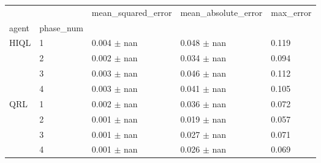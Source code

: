 \begin{tabular}{lllll}
\toprule
 &  & mean_squared_error & mean_absolute_error & max_error \\
agent & phase_num &  &  &  \\
\midrule
\multirow[t]{4}{*}{HIQL} & 1 & 0.004 $\pm$ nan & 0.048 $\pm$ nan & 0.119 \\
 & 2 & 0.002 $\pm$ nan & 0.034 $\pm$ nan & 0.094 \\
 & 3 & 0.003 $\pm$ nan & 0.046 $\pm$ nan & 0.112 \\
 & 4 & 0.003 $\pm$ nan & 0.041 $\pm$ nan & 0.105 \\
\cline{1-5}
\multirow[t]{4}{*}{QRL} & 1 & 0.002 $\pm$ nan & 0.036 $\pm$ nan & 0.072 \\
 & 2 & 0.001 $\pm$ nan & 0.019 $\pm$ nan & 0.057 \\
 & 3 & 0.001 $\pm$ nan & 0.027 $\pm$ nan & 0.071 \\
 & 4 & 0.001 $\pm$ nan & 0.026 $\pm$ nan & 0.069 \\
\cline{1-5}
\bottomrule
\end{tabular}
